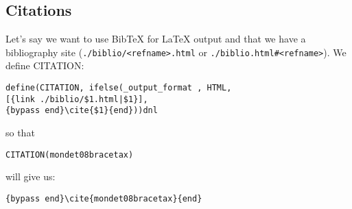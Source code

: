 \documentclass[a4paper,10pt]{article}
\begin{document}
\subsection{Citations}
\label{secbiblio}
  Let's say we want to use BibTeX for LaTeX output and that we have a bibliography site (\texttt{.\slash{}\linebreak[0]biblio\slash{}\linebreak[0]<refname>.html} or \texttt{.\slash{}\linebreak[0]biblio.html\#{}<refname>}).   We define CITATION: %
\begin{verbatim}
define(CITATION, ifelse(_output_format , HTML,
[{link ./biblio/$1.html|$1}],
{bypass end}\cite{$1}{end}))dnl
\end{verbatim} so that %
\begin{verbatim}
CITATION(mondet08bracetax)
\end{verbatim} will give us: %
\begin{verbatim}
{bypass end}\cite{mondet08bracetax}{end}
\end{verbatim}   
\end{document}
